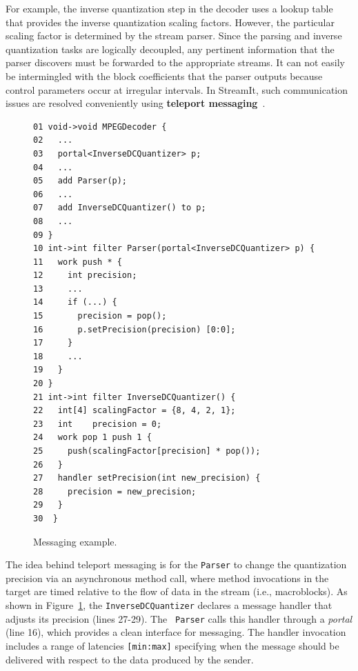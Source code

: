 For example, the inverse quantization step in the decoder uses a
lookup table that provides the inverse quantization scaling factors.
However, the particular scaling factor is determined by the stream
parser. Since the parsing and inverse quantization tasks are logically
decoupled, any pertinent information that the parser discovers must be
forwarded to the appropriate streams. It can not easily be intermingled
with the block coefficients that the parser outputs because
control parameters occur at irregular intervals. 
In StreamIt, such communication issues are resolved conveniently
using \textbf{teleport messaging}~\cite{thies05ppopp}.

\begin{figure}
  \begin{center}
    \begin{minipage}{4.25in}
      \begin{small}
        \begin{verbatim}
01 void->void MPEGDecoder {
02   ...
03   portal<InverseDCQuantizer> p;
04   ...
05   add Parser(p);
06   ...
07   add InverseDCQuantizer() to p;
08   ...
09 }
10 int->int filter Parser(portal<InverseDCQuantizer> p) {
11   work push * {
12     int precision;
13     ...
14     if (...) {
15       precision = pop();
16       p.setPrecision(precision) [0:0];
17     }
18     ...
19   }
20 }
21 int->int filter InverseDCQuantizer() {
22   int[4] scalingFactor = {8, 4, 2, 1};
23   int    precision = 0;
24   work pop 1 push 1 {
25     push(scalingFactor[precision] * pop());
26   }
27   handler setPrecision(int new_precision) {
28     precision = new_precision;
29   }
30  }
        \end{verbatim}
      \end{small}
    \end{minipage}
  \end{center}
  \caption{Messaging example.}
  \label{fig:messaging}
\end{figure}

The idea behind teleport messaging is for the {\tt Parser} to change
the quantization precision via an asynchronous method call, where
method invocations in the target are timed relative to the flow of
data in the stream (i.e., macroblocks). As shown in
Figure~\ref{fig:messaging}, the {\tt InverseDCQuantizer} declares a
message handler that adjusts its precision (lines 27-29). The {\tt
Parser} calls this handler through a {\it portal} (line 16), which
provides a clean interface for messaging.  The handler invocation
includes a range of latencies {\tt [min:max]} specifying when the
message should be delivered with respect to the data produced by the
sender.

